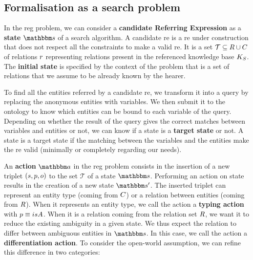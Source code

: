 \subsection{Formalisation as a search problem}

In the \acrshort{reg} problem, we can consider a \textbf{candidate Referring Expression} as a \textbf{state} $\state$ of a search algorithm. A candidate \acrshort{re} is a \acrshort{re} under construction that does not respect all the constraints to make a valid \acrshort{re}. It is a set $\mathcal{T} \subseteq R \cup C$ of relations $r$ representing relations present in the referenced knowledge base $K_S$. The \textbf{initial state} is specified by the context of the problem that is a set of relations that we assume to be already known by the hearer.

To find all the entities referred by a candidate \acrshort{re}, we transform it into a \sparql{} query by replacing the anonymous entities with variables. We then submit it to the ontology to know which entities can be bound to each variable of the query. Depending on whether the result of the query gives the correct matches between variables and entities or not, we can know if a state is a \textbf{target state} or not. A state is a target state if the matching between the variables and the entities make the \acrshort{re} valid (minimally or completely regarding our needs).

An \textbf{action} $\action$ in the \acrshort{reg} problem consists in the insertion of a new triplet $(s, p, o)$ to the set $\mathcal{T}$ of a state $\state$. Performing an action on state results in the creation of a new state $\state'$. The inserted triplet can represent an entity type (coming from $C$) or a relation between entities (coming from $R$). When it represents an entity type, we call the action a \textbf{typing action} with $p \equiv isA$. When it is a relation coming from the relation set $R$, we want it to reduce the existing ambiguity in a given state. We thus expect the relation to differ between ambiguous entities in $\state$. In this case, we call the action a \textbf{differentiation action}. To consider the open-world assumption, we can refine this difference in two categories:

